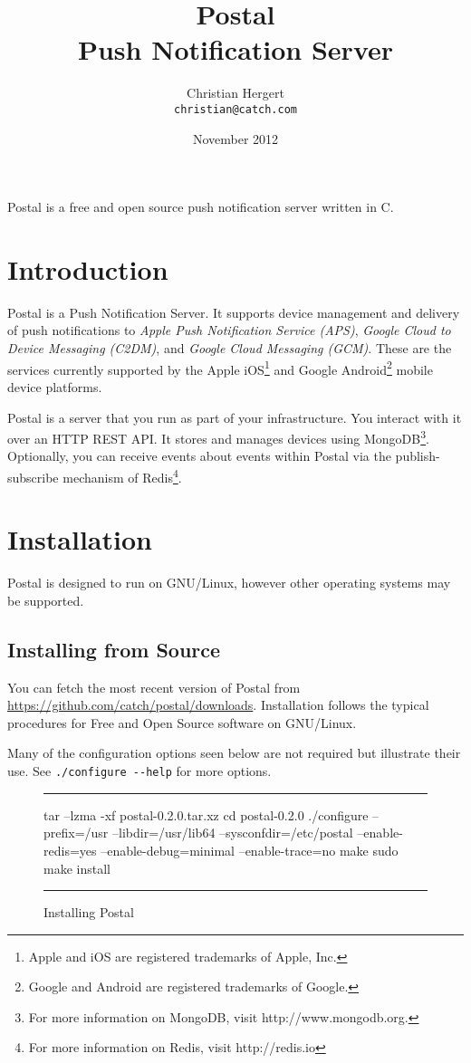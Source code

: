 \documentclass[12pt]{article}
\title{Postal \\ Push Notification Server}
\author{Christian Hergert \\
    \small \texttt{christian@catch.com}
}
\date{November 2012}
\begin{document}
\maketitle

Postal is a free and open source push notification server written in C.

\section{Introduction}

Postal is a Push Notification Server.
It supports device management and delivery of push notifications to \emph{Apple Push Notification Service (APS)}, \emph{Google Cloud to Device Messaging (C2DM)}, and \emph{Google Cloud Messaging (GCM)}.
These are the services currently supported by the Apple iOS\footnote{Apple and iOS are registered trademarks of Apple, Inc.} and Google Android\footnote{Google and Android are registered trademarks of Google.} mobile device platforms.

Postal is a server that you run as part of your infrastructure.
You interact with it over an HTTP REST API.
It stores and manages devices using MongoDB\footnote{For more information on MongoDB, visit http://www.mongodb.org.}.
Optionally, you can receive events about events within Postal via the publish-subscribe mechanism of Redis\footnote{For more information on Redis, visit http://redis.io}.

\section{Installation}

Postal is designed to run on GNU/Linux, however other operating systems may be supported.

\subsection{Installing from Source}

You can fetch the most recent version of Postal from \url{https://github.com/catch/postal/downloads}.
Installation follows the typical procedures for Free and Open Source software on GNU/Linux.

Many of the configuration options seen below are not required but illustrate their use. See \verb|./configure --help| for more options.

\begin{figure}[h!]
\hrule
\begin{Terminal}
tar --lzma -xf postal-0.2.0.tar.xz
cd postal-0.2.0
./configure --prefix=/usr --libdir=/usr/lib64 --sysconfdir=/etc/postal --enable-redis=yes --enable-debug=minimal --enable-trace=no
make
sudo make install
\end{Terminal}
\hrule
\caption{Installing Postal}
\end{figure}
\end{document}
